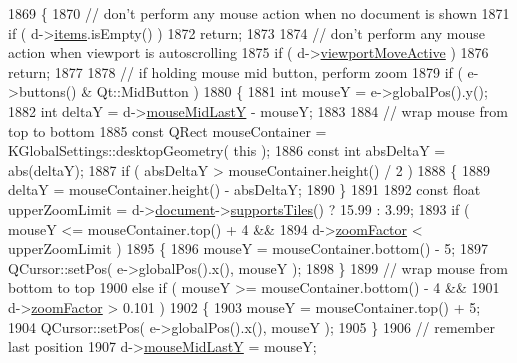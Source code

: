 \begin{DoxyCode}
1869 \{
1870     \textcolor{comment}{// don't perform any mouse action when no document is shown}
1871     \textcolor{keywordflow}{if} ( d->\hyperlink{classPageViewPrivate_ad90c795dead9abfaa5818a94e00435bc}{items}.isEmpty() )
1872         \textcolor{keywordflow}{return};
1873 
1874     \textcolor{comment}{// don't perform any mouse action when viewport is autoscrolling}
1875     \textcolor{keywordflow}{if} ( d->\hyperlink{classPageViewPrivate_acc47dfc95cad4f126c4dbd3e8f31e43b}{viewportMoveActive} )
1876         \textcolor{keywordflow}{return};
1877 
1878     \textcolor{comment}{// if holding mouse mid button, perform zoom}
1879     \textcolor{keywordflow}{if} ( e->buttons() & Qt::MidButton )
1880     \{
1881         \textcolor{keywordtype}{int} mouseY = e->globalPos().y();
1882         \textcolor{keywordtype}{int} deltaY = d->\hyperlink{classPageViewPrivate_a0962e2c6de7921af1c3e42cae846bd65}{mouseMidLastY} - mouseY;
1883 
1884         \textcolor{comment}{// wrap mouse from top to bottom}
1885         \textcolor{keyword}{const} QRect mouseContainer = KGlobalSettings::desktopGeometry( \textcolor{keyword}{this} );
1886         \textcolor{keyword}{const} \textcolor{keywordtype}{int} absDeltaY = abs(deltaY);
1887         \textcolor{keywordflow}{if} ( absDeltaY > mouseContainer.height() / 2 )
1888         \{
1889             deltaY = mouseContainer.height() - absDeltaY;
1890         \}
1891 
1892         \textcolor{keyword}{const} \textcolor{keywordtype}{float} upperZoomLimit = d->\hyperlink{classPageViewPrivate_a50645b9853306cffd74e51efb677e5b4}{document}->\hyperlink{classOkular_1_1Document_a195dd7b2d52ecaf17541a437d5f9e579}{supportsTiles}() ? 15.99 : 3.99;
1893         \textcolor{keywordflow}{if} ( mouseY <= mouseContainer.top() + 4 &&
1894              d->\hyperlink{classPageViewPrivate_a938411ef880f839b765aeac48a482b9e}{zoomFactor} < upperZoomLimit )
1895         \{
1896             mouseY = mouseContainer.bottom() - 5;
1897             QCursor::setPos( e->globalPos().x(), mouseY );
1898         \}
1899         \textcolor{comment}{// wrap mouse from bottom to top}
1900         \textcolor{keywordflow}{else} \textcolor{keywordflow}{if} ( mouseY >= mouseContainer.bottom() - 4 &&
1901                   d->\hyperlink{classPageViewPrivate_a938411ef880f839b765aeac48a482b9e}{zoomFactor} > 0.101 )
1902         \{
1903             mouseY = mouseContainer.top() + 5;
1904             QCursor::setPos( e->globalPos().x(), mouseY );
1905         \}
1906         \textcolor{comment}{// remember last position}
1907         d->\hyperlink{classPageViewPrivate_a0962e2c6de7921af1c3e42cae846bd65}{mouseMidLastY} = mouseY;

\end{DoxyCode}
